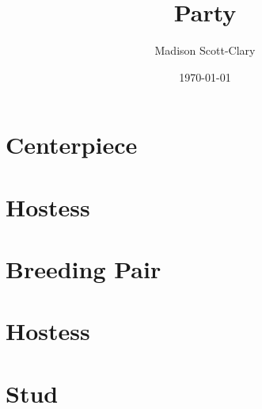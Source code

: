 \documentclass[12pt,letterpaper,oneside]{memoir}
\title{Party}
\author{Madison Scott-Clary}
\date{\today}
\begin{document}
  \maketitle

  \newpage
  \tableofcontents*

  \chapter{Centerpiece}
  

  \chapter{Hostess}
  

  \chapter{Breeding Pair}
  

  \chapter{Hostess}
  

  \chapter{Stud}
  
\end{document}
